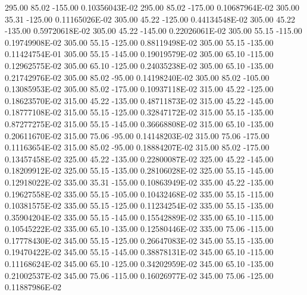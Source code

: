      295.00      85.02    -155.00      0.10356043E-02
     295.00      85.02    -175.00      0.10687964E-02
     305.00      35.31    -125.00      0.11165026E-02
     305.00      45.22    -125.00      0.44134548E-02
     305.00      45.22    -135.00      0.59720618E-02
     305.00      45.22    -145.00      0.22026061E-02
     305.00      55.15    -115.00      0.19749908E-02
     305.00      55.15    -125.00      0.88119498E-02
     305.00      55.15    -135.00      0.11424754E-01
     305.00      55.15    -145.00      0.19019579E-02
     305.00      65.10    -115.00      0.12962575E-02
     305.00      65.10    -125.00      0.24035238E-02
     305.00      65.10    -135.00      0.21742976E-02
     305.00      85.02     -95.00      0.14198240E-02
     305.00      85.02    -105.00      0.13085953E-02
     305.00      85.02    -175.00      0.10937118E-02
     315.00      45.22    -125.00      0.18623570E-02
     315.00      45.22    -135.00      0.48711873E-02
     315.00      45.22    -145.00      0.18777108E-02
     315.00      55.15    -125.00      0.32847172E-02
     315.00      55.15    -135.00      0.87277275E-02
     315.00      55.15    -145.00      0.36668808E-02
     315.00      65.10    -135.00      0.20611670E-02
     315.00      75.06     -95.00      0.14148203E-02
     315.00      75.06    -175.00      0.11163654E-02
     315.00      85.02     -95.00      0.18884207E-02
     315.00      85.02    -175.00      0.13457458E-02
     325.00      45.22    -135.00      0.22800087E-02
     325.00      45.22    -145.00      0.18209912E-02
     325.00      55.15    -135.00      0.28106028E-02
     325.00      55.15    -145.00      0.12918022E-02
     335.00      35.31    -155.00      0.10863949E-02
     335.00      45.22    -135.00      0.19627558E-02
     335.00      55.15    -105.00      0.10432468E-02
     335.00      55.15    -115.00      0.10381575E-02
     335.00      55.15    -125.00      0.11234254E-02
     335.00      55.15    -135.00      0.35904204E-02
     335.00      55.15    -145.00      0.15542889E-02
     335.00      65.10    -115.00      0.10545222E-02
     335.00      65.10    -135.00      0.12580446E-02
     335.00      75.06    -115.00      0.17778430E-02
     345.00      55.15    -125.00      0.26647083E-02
     345.00      55.15    -135.00      0.19470422E-02
     345.00      55.15    -145.00      0.38878131E-02
     345.00      65.10    -115.00      0.11168624E-02
     345.00      65.10    -125.00      0.34202959E-02
     345.00      65.10    -135.00      0.21002537E-02
     345.00      75.06    -115.00      0.16026977E-02
     345.00      75.06    -125.00      0.11887986E-02

